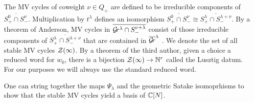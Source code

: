 \documentclass[draft]{article} %
\begin{document}
The  MV cycles of coweight $\nu\in Q_+$ are defined to be irreducible components of $\overline{S^0_+ \cap S^\nu_-}$.  Multiplication by $ t^\lambda $ defines an isomorphism $\overline{S^0_+ \cap S^\nu_-} \cong \overline{S^\lambda_+ \cap S^{\lambda+\nu}_-} $.  By a theorem of Anderson, MV cycles in $\overline{\mathcal{G}\!r^\lambda\cap S^{\nu + \lambda}_-}$ consist of those irreducible components of $ \overline{S^\lambda_+ \cap S^{\lambda+\nu}_-} $ that are contained in $\overline{\mathcal{G}\!r}^\lambda$ \cite[Proposition~3]{anderson2003polytope}. We denote the set of all stable MV cycles $\mathcal Z(\infty)$. 
By a theorem of the third author, given a choice a reduced word for $ w_0 $, there is a bijection $ \mathcal Z(\infty) \rightarrow \mathbb N^{r} $ called the Lusztig datum.  For our purposes we will always use the standard reduced word.

One can string together the maps $\Psi_\lambda$ and the geometric Satake isomoprhisms to show that the stable MV cycles yield a basis of $\mathbb C[N]$.  
\end{document}
